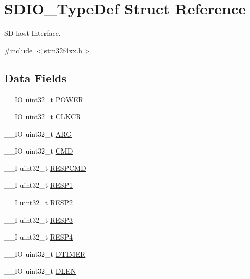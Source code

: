 \hypertarget{struct_s_d_i_o___type_def}{\section{S\-D\-I\-O\-\_\-\-Type\-Def Struct Reference}
\label{struct_s_d_i_o___type_def}
}


S\-D host Interface.  




{\ttfamily \#include $<$stm32f4xx.\-h$>$}

\subsection*{Data Fields}
\begin{DoxyCompactItemize}
\item 
\-\_\-\-\_\-\-I\-O uint32\-\_\-t \hyperlink{struct_s_d_i_o___type_def_a65bff76f3af24c37708a1006d54720c7}{P\-O\-W\-E\-R}
\item 
\-\_\-\-\_\-\-I\-O uint32\-\_\-t \hyperlink{struct_s_d_i_o___type_def_aa94197378e20fc739d269be49d9c5d40}{C\-L\-K\-C\-R}
\item 
\-\_\-\-\_\-\-I\-O uint32\-\_\-t \hyperlink{struct_s_d_i_o___type_def_a07d4e63efcbde252c667e64a8d818aa9}{A\-R\-G}
\item 
\-\_\-\-\_\-\-I\-O uint32\-\_\-t \hyperlink{struct_s_d_i_o___type_def_adcf812cbe5147d300507d59d4a55935d}{C\-M\-D}
\item 
\-\_\-\-\_\-\-I uint32\-\_\-t \hyperlink{struct_s_d_i_o___type_def_aad371db807e2db4a2edf05b3f2f4b6cd}{R\-E\-S\-P\-C\-M\-D}
\item 
\-\_\-\-\_\-\-I uint32\-\_\-t \hyperlink{struct_s_d_i_o___type_def_a7b0ee0dc541683266dfab6335abca891}{R\-E\-S\-P1}
\item 
\-\_\-\-\_\-\-I uint32\-\_\-t \hyperlink{struct_s_d_i_o___type_def_a4d99c78dffdb6e81e8f6b7abec263419}{R\-E\-S\-P2}
\item 
\-\_\-\-\_\-\-I uint32\-\_\-t \hyperlink{struct_s_d_i_o___type_def_a3da04fbdd44f48a1840e5e0a6295f3cf}{R\-E\-S\-P3}
\item 
\-\_\-\-\_\-\-I uint32\-\_\-t \hyperlink{struct_s_d_i_o___type_def_ac760383de212de696f504e744c6fca7e}{R\-E\-S\-P4}
\item 
\-\_\-\-\_\-\-I\-O uint32\-\_\-t \hyperlink{struct_s_d_i_o___type_def_a1dd219eaeee8d9def822da843028bd02}{D\-T\-I\-M\-E\-R}
\item 
\-\_\-\-\_\-\-I\-O uint32\-\_\-t \hyperlink{struct_s_d_i_o___type_def_a612edc78d2fa6288392f8ea32c36f7fb}{D\-L\-E\-N}

\end{DoxyCompactItemize}
